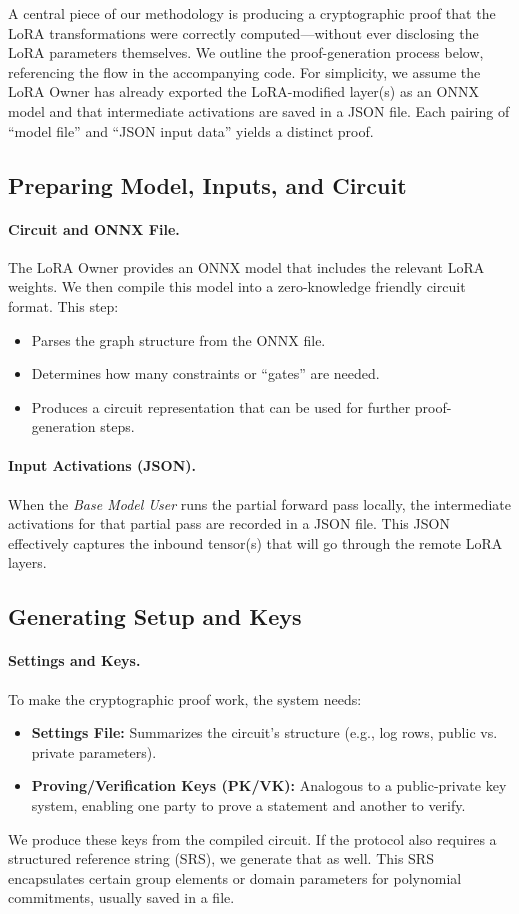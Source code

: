 \documentclass[11pt]{article}
\begin{document}
A central piece of our methodology is producing a cryptographic proof that the LoRA transformations were correctly computed—without ever disclosing the LoRA parameters themselves. We outline the proof-generation process below, referencing the flow in the accompanying code. For simplicity, we assume the LoRA Owner has already exported the LoRA-modified layer(s) as an ONNX model and that intermediate activations are saved in a JSON file. Each pairing of “model file” and “JSON input data” yields a distinct proof.

\subsection{Preparing Model, Inputs, and Circuit}
\paragraph{Circuit and ONNX File.}
The LoRA Owner provides an ONNX model that includes the relevant LoRA weights. We then compile this model into a zero-knowledge friendly circuit format. This step:
\begin{itemize}
    \item Parses the graph structure from the ONNX file.
    \item Determines how many constraints or “gates” are needed.
    \item Produces a circuit representation that can be used for further proof-generation steps.
\end{itemize}

\paragraph{Input Activations (JSON).}
When the \emph{Base Model User} runs the partial forward pass locally, the intermediate activations for that partial pass are recorded in a JSON file. This JSON effectively captures the inbound tensor(s) that will go through the remote LoRA layers.

\subsection{Generating Setup and Keys}
\paragraph{Settings and Keys.}
To make the cryptographic proof work, the system needs:
\begin{itemize}
    \item \textbf{Settings File:} Summarizes the circuit’s structure (e.g., log rows, public vs. private parameters). 
    \item \textbf{Proving/Verification Keys (PK/VK):} Analogous to a public-private key system, enabling one party to prove a statement and another to verify.
\end{itemize}
We produce these keys from the compiled circuit. If the protocol also requires a structured reference string (SRS), we generate that as well. This SRS encapsulates certain group elements or domain parameters for polynomial commitments, usually saved in a file.
\end{document}
